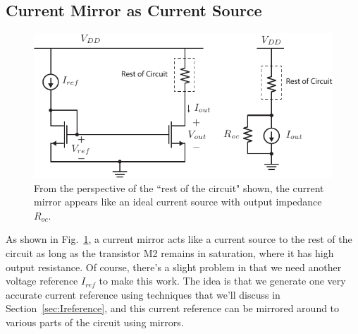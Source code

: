 \subsection{Current Mirror as Current Source}
\begin{figure}[tb]
\centering
\includegraphics[scale=1]{7mirror_current_source.pdf}
\caption{From the perspective of the ``rest of the circuit" shown, the current mirror appears like an ideal current source with output impedance $R_{oc}$.}
\label{fig:7mirror_current_source.pdf}
\end{figure}
As shown in Fig.~\ref{fig:7mirror_current_source.pdf}, a current mirror acts like a current source to the rest of the circuit as long as the transistor M2 remains in saturation, where it has high output resistance.  Of course, there's a slight problem in that we need another voltage reference $I_{ref}$ to make this work.  The idea is that we generate one very accurate current reference using techniques that we'll discuss in Section~\ref{sec:Ireference}, and this current reference can be mirrored around to various parts of the circuit using mirrors.  
